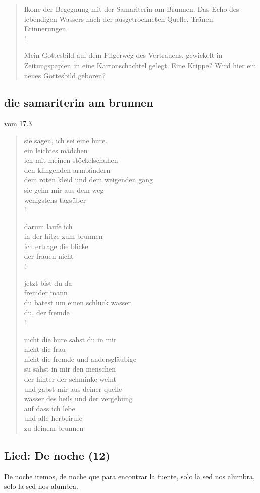 \begin{impuls}
\begin{description}
\begin{gedicht}
\begin{verse}
Ikone der Begegnung mit der Samariterin am Brunnen. Das Echo des lebendigen Wassers nach der ausgetrockneten Quelle. Tränen. Erinnerungen.\\!

Mein Gottesbild auf dem Pilgerweg des Vertrauens, gewickelt in Zeitungspapier, in eine Kartonschachtel gelegt. Eine Krippe? Wird hier ein neues Gottesbild geboren?
\end{verse}
 \end{gedicht}
\end{description}
\end{impuls}

\subsection{die samariterin am brunnen}
\cite{KHH} vom 17.3
\begin{gedicht}
\begin{verse}
sie sagen, ich sei eine hure.\\
ein leichtes mädchen\\
ich mit meinen stöckelschuhen\\
den klingenden armbändern\\
dem roten kleid und dem weigenden gang\\
sie gehn mir aus dem weg\\
wenigstens tagsüber\\!

darum laufe ich\\
in der hitze zum brunnen\\
ich ertrage die blicke\\
der frauen nicht\\!

jetzt bist du da\\
fremder mann\\
du batest um einen schluck wasser\\
du, der fremde\\!

nicht die hure sahst du in mir\\
nicht die frau\\
nicht die fremde und andersgläubige\\
su sahst in mir den menschen\\
der hinter der schminke weint\\
und gabst mir aus deiner quelle\\
wasser des heils und der vergebung\\
auf dass ich lebe\\
und alle herbeirufe\\
zu deinem brunnen
\end{verse}
\end{gedicht}

\subsection{Lied: De noche (12)}
De noche iremos, de noche que para encontrar la fuente, solo la sed nos alumbra, solo la sed nos alumbra.
